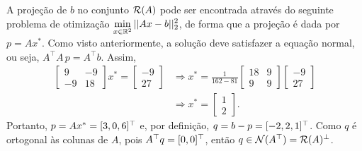 \begin{questions}
\begin{solution}
    A projeção de $b$ no conjunto $\cal{R}(A)$ pode ser encontrada através do seguinte problema de otimização
    $\displaystyle\min_{x\in\R^2}||Ax-b||_2^2$, de forma que a projeção é dada por $p=Ax^*$. Como visto anteriormente, a solução deve satisfazer a equação normal, ou seja, $A^\top A\,p = A^\top b.$ Assim,
   \begin{align*}
        \begin{bmatrix}
            9  &   -9  \\
            -9  &   18
        \end{bmatrix}
        x^* =
        \begin{bmatrix}
            -9\\ 27
        \end{bmatrix}
        &\Rightarrow
        x^* = \frac{1}{162-81}
        \begin{bmatrix}
            18  & 9 \\
            9   & 9
        \end{bmatrix}
        \begin{bmatrix}
            -9\\ 27
        \end{bmatrix}\\
        &\Rightarrow
        \boxed{
        x^* = 
        \begin{bmatrix}
            1\\ 2
        \end{bmatrix}
        }.
    \end{align*}
    Portanto, $p = Ax^* = [3,0,6]^\T$ e, por definição, $q = b-p = [-2,2,1]^\T$. Como $q$ é ortogonal às colunas de $A$, pois $A^\T q = [0,0]^\T$, então $q\in\cal{N}(A^\T)=\cal{R}(A)^\perp$.
\end{solution}


\end{questions}
